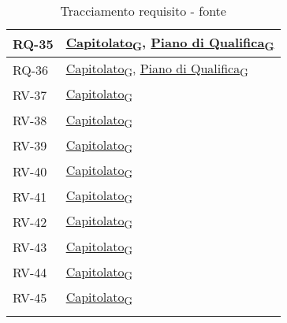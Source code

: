 \begin{longtable}{|>{\centering\arraybackslash}m{}|>{\centering\arraybackslash}m{}|}
	RQ-35           & \href{https://7last.github.io/docs/rtb/documentazione-interna/glossario\#capitolato}{Capitolato\textsubscript{G}}, \href{https://7last.github.io/docs/rtb/documentazione-interna/glossario\#piano-di-qualifica}{Piano di Qualifica\textsubscript{G}} \\\hline
	RQ-36           & \href{https://7last.github.io/docs/rtb/documentazione-interna/glossario\#capitolato}{Capitolato\textsubscript{G}}, \href{https://7last.github.io/docs/rtb/documentazione-interna/glossario\#piano-di-qualifica}{Piano di Qualifica\textsubscript{G}} \\\hline
	RV-37           & \href{https://7last.github.io/docs/rtb/documentazione-interna/glossario\#capitolato}{Capitolato\textsubscript{G}} \\\hline
	RV-38           & \href{https://7last.github.io/docs/rtb/documentazione-interna/glossario\#capitolato}{Capitolato\textsubscript{G}} \\\hline
	RV-39           & \href{https://7last.github.io/docs/rtb/documentazione-interna/glossario\#capitolato}{Capitolato\textsubscript{G}} \\\hline
	RV-40           & \href{https://7last.github.io/docs/rtb/documentazione-interna/glossario\#capitolato}{Capitolato\textsubscript{G}} \\\hline
	RV-41           & \href{https://7last.github.io/docs/rtb/documentazione-interna/glossario\#capitolato}{Capitolato\textsubscript{G}} \\\hline
	RV-42           & \href{https://7last.github.io/docs/rtb/documentazione-interna/glossario\#capitolato}{Capitolato\textsubscript{G}} \\\hline
	RV-43           & \href{https://7last.github.io/docs/rtb/documentazione-interna/glossario\#capitolato}{Capitolato\textsubscript{G}} \\\hline
	RV-44           & \href{https://7last.github.io/docs/rtb/documentazione-interna/glossario\#capitolato}{Capitolato\textsubscript{G}} \\\hline
	RV-45           & \href{https://7last.github.io/docs/rtb/documentazione-interna/glossario\#capitolato}{Capitolato\textsubscript{G}} \\\hline
	\caption{Tracciamento requisito - fonte}
	\label{table:4}
\end{longtable}

